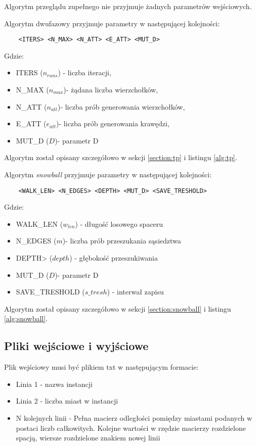Algorytm przeglądu zupełnego nie przyjmuje żadnych parametrów wejściowych.

Algorytm dwufazowy przyjmuje parametry w następującej kolejności:

\begin{lstlisting}
    <ITERS> <N_MAX> <N_ATT> <E_ATT> <MUT_D>
\end{lstlisting}
Gdzie:
\begin{itemize}
    \item ITERS ($n_{runs}$) - liczba iteracji,
    \item N\_MAX ($n_{max}$)- żądana liczba wierzchołków,
    \item N\_ATT ($n_{att}$)- liczba prób generowania wierzchołków,
    \item E\_ATT ($e_{att}$)- liczba prób generowania krawędzi,
    \item MUT\_D ($D$)- parametr D
\end{itemize}

Algorytm został opisany szczegółowo w sekcji \ref{section:tp} i listingu \ref{alg:tp}.

Algorytm \textit{snowball} przyjmuje parametry w następującej kolejności:

\begin{lstlisting}
    <WALK_LEN> <N_EDGES> <DEPTH> <MUT_D> <SAVE_TRESHOLD>
\end{lstlisting}
Gdzie:
\begin{itemize}
    \item WALK\_LEN ($w_{len}$) - długość losowego spaceru
    \item N\_EDGES ($m$)- liczba prób przeszukania sąsiedztwa
    \item DEPTH> ($depth$) - głębokość przeszukiwania
    \item MUT\_D ($D$)- parametr D
    \item SAVE\_TRESHOLD ($s\_tresh$) - interwał zapisu
\end{itemize}

Algorytm został opisany szczegółowo w sekcji \ref{section:snowball} i listingu \ref{alg:snowball}.

\subsection{Pliki wejściowe i wyjściowe}

Plik wejściowy musi być plikiem txt w następującym formacie:
\begin{itemize}
    \item Linia 1 - nazwa instancji
    \item Linia 2 - liczba miast w instancji
    \item N kolejnych linii - Pełna macierz odległości pomiędzy miastami podanych w postaci liczb całkowitych.
          Kolejne wartości w rzędzie macierzy rozdzielone spacją, wiersze rozdzielone znakiem nowej linii
\end{itemize}


